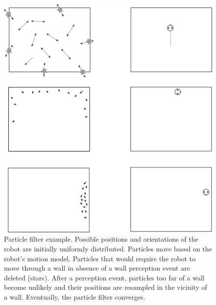 \begin{figure}
	\centering
		\includegraphics[width=\textwidth]{figs/particlefilter_example}
	\caption{Particle filter example. Possible positions and orientations of the robot are initially uniformly distributed. Particles move based on the robot's motion model. Particles that would require the robot to move through a wall in absence of a wall perception event are deleted (stars). After a perception event, particles too far of a wall become unlikely and their positions are resampled in the vicinity of a wall. Eventually, the particle filter converges.}
	\label{fig:particlefilter_example}
\end{figure}


